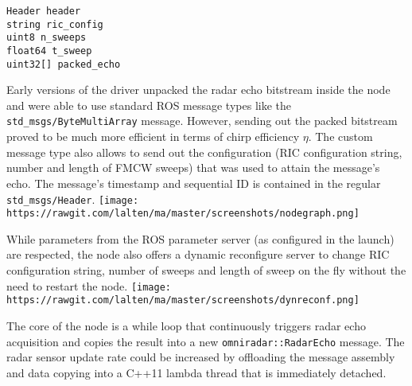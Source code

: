 \begin{verbatim}
Header header
string ric_config
uint8 n_sweeps
float64 t_sweep
uint32[] packed_echo
\end{verbatim}

Early versions of the driver unpacked the radar echo bitstream inside
the node and were able to use standard ROS message types like the
\texttt{std\_msgs/ByteMultiArray} message. However, sending out the
packed bitstream proved to be much more efficient in terms of chirp
efficiency \(\eta\). The custom message type also allows to send out the
configuration (RIC configuration string, number and length of FMCW
sweeps) that was used to attain the message's echo. The message's
timestamp and sequential ID is contained in the regular
\texttt{std\_msgs/Header}.
\texttt{[image: https://rawgit.com/lalten/ma/master/screenshots/nodegraph.png]}

While parameters from the ROS parameter server (as configured in the
launch) are respected, the node also offers a dynamic reconfigure server
to change RIC configuration string, number of sweeps and length of sweep
on the fly without the need to restart the node.
\texttt{[image: https://rawgit.com/lalten/ma/master/screenshots/dynreconf.png]}

The core of the node is a while loop that continuously triggers radar
echo acquisition and copies the result into a new
\texttt{omniradar::RadarEcho} message. The radar sensor update rate
could be increased by offloading the message assembly and data copying
into a C++11 lambda thread that is immediately detached.

\begin{Shaded}
\begin{Highlighting}[]

\NormalTok{    [=] ()}
\NormalTok{    \{}
\NormalTok{    \}}
\NormalTok{);}
\end{Highlighting}
\end{Shaded}

